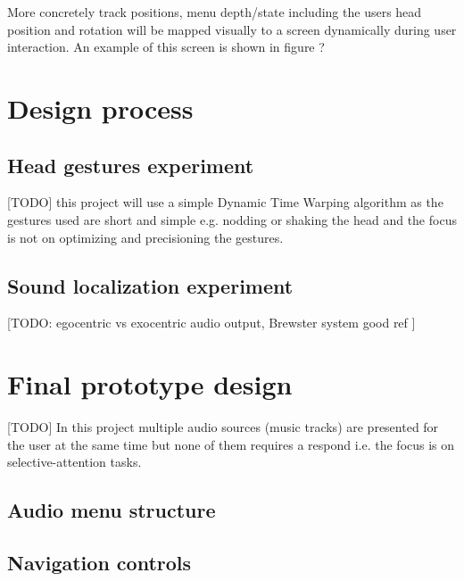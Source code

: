 More concretely track positions, menu depth/state including the users head position and rotation will be mapped visually to a screen dynamically during user interaction. An example of this screen is shown in figure ?

\section{Design process}

\subsection{Head gestures experiment}

[TODO]
this project will use a simple Dynamic Time Warping algorithm \cite{meinard_muller_information_2007} as the gestures used are short and simple e.g. nodding or shaking the head and the focus is not on optimizing and precisioning the gestures.

\subsection{Sound localization experiment}

[TODO: egocentric vs exocentric audio output, Brewster system good ref \cite{vazquez-alvarez_eyes-free_2011}]

\section{Final prototype design}

[TODO]
In this project multiple audio sources (music tracks) are presented for the user at the same time but none of them requires a respond i.e. the focus is on selective-attention tasks.

\subsection{Audio menu structure}



\subsection{Navigation controls}


